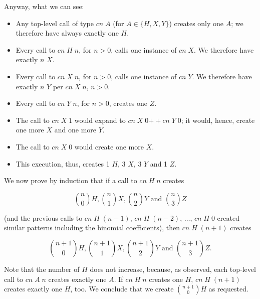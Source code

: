 \documentclass[tikz]{scrreprt}
\newcommand{\Conid}[1]{\mathit{#1}}
\newcommand{\Varid}[1]{\mathit{#1}}
\newcommand{\plus}{\mathbin{+\!\!\!+}}
\begin{document}
Anyway, what we can see:
\begin{itemize}
\item Any top-level call of type \ensuremath{\Varid{cn}\;\Conid{A}} 
      (for $A \in \lbrace H,X,Y\rbrace$)
      creates only one \ensuremath{\Conid{A}};
      we therefore have always exactly one \ensuremath{\Conid{H}}.
\item Every call to \ensuremath{\Varid{cn}\;\Conid{H}\;\Varid{n}}, for $n > 0$,
      calls one instance of \ensuremath{\Varid{cn}\;\Conid{X}}.
      We therefore have exactly $n$ \ensuremath{\Conid{X}}.
\item Every call to \ensuremath{\Varid{cn}\;\Conid{X}\;\Varid{n}}, for $n > 0$,
      calls one instance of \ensuremath{\Varid{cn}\;\Conid{Y}}.
      We therefore have exactly $n$ \ensuremath{\Conid{Y}} per \ensuremath{\Varid{cn}\;\Conid{X}\;\Varid{n}},
      $n > 0$.
\item Every call to \ensuremath{\Varid{cn}\;\Conid{Y}\;\Varid{n}}, for $n>0$, creates one \ensuremath{\Conid{Z}}.
\item The call to \ensuremath{\Varid{cn}\;\Conid{X}\;\mathrm{1}} would expand to
      \ensuremath{\Varid{cn}\;\Conid{X}\;\mathrm{0}\plus \Varid{cn}\;\Conid{Y}\;\mathrm{0}}; it would, hence,
      create one more \ensuremath{\Conid{X}} and one more \ensuremath{\Conid{Y}}.
\item The call to \ensuremath{\Varid{cn}\;\Conid{X}\;\mathrm{0}} would create one more \ensuremath{\Conid{X}}.
\item This execution, thus, creates
      1 \ensuremath{\Conid{H}}, 3 \ensuremath{\Conid{X}}, 3 \ensuremath{\Conid{Y}} and 1 \ensuremath{\Conid{Z}}.
\end{itemize}

We now prove by induction that if a call to \ensuremath{\Varid{cn}\;\Conid{H}\;\Varid{n}}
creates 

\[
\binom{n}{0}H, \binom{n}{1}X, \binom{n}{2}Y 
\text{ and } \binom{n}{3}Z
\]

(and the previous calls to \ensuremath{\Varid{cn}\;\Conid{H}\;(\Varid{n}\mathbin{-}\mathrm{1})}, \ensuremath{\Varid{cn}\;\Conid{H}\;(\Varid{n}\mathbin{-}\mathrm{2})},
$\dots$, \ensuremath{\Varid{cn}\;\Conid{H}\;\mathrm{0}} created similar patterns including
the binomial coefficients),
then \ensuremath{\Varid{cn}\;\Conid{H}\;(\Varid{n}\mathbin{+}\mathrm{1})} creates

\[
\binom{n+1}{0}H, \binom{n+1}{1}X, \binom{n+1}{2}Y 
\text{ and } \binom{n+1}{3}Z.
\]

Note that the number of \ensuremath{\Conid{H}} does not increase,
because, as observed, each top-level call to \ensuremath{\Varid{cn}\;\Conid{A}\;\Varid{n}}
creates exactly one \ensuremath{\Conid{A}}.
If \ensuremath{\Varid{cn}\;\Conid{H}\;\Varid{n}} creates one \ensuremath{\Conid{H}},
\ensuremath{\Varid{cn}\;\Conid{H}\;(\Varid{n}\mathbin{+}\mathrm{1})} creates exactly one \ensuremath{\Conid{H}}, too.
We conclude that we create $\binom{n+1}{0}H$ as requested.
\end{document}
